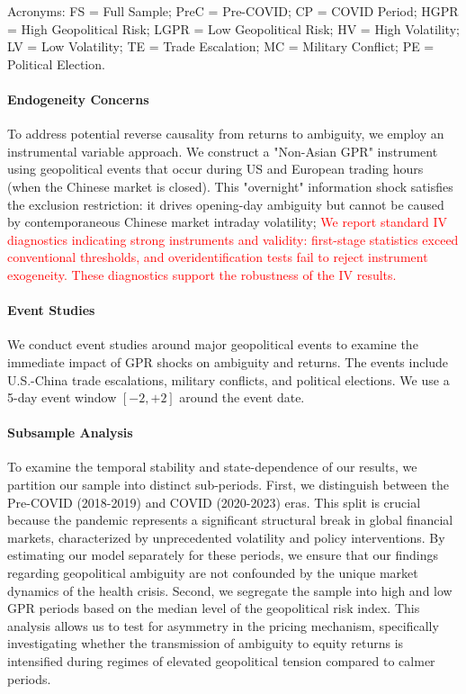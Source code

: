 \documentclass[preprint,12pt,authoryear]{elsarticle}
\begin{document}
\begin{table}[htbp]
\begin{threeparttable}
\begin{tablenotes}[flushleft]
\item[] Acronyms: FS = Full Sample; PreC = Pre-COVID; CP = COVID Period; HGPR = High Geopolitical Risk; LGPR = Low Geopolitical Risk; HV = High Volatility; LV = Low Volatility; TE = Trade Escalation; MC = Military Conflict; PE = Political Election.
\end{tablenotes}
\end{threeparttable}
\end{table}

\paragraph{Endogeneity Concerns} To address potential reverse causality from returns to ambiguity, we employ an instrumental variable approach. We construct a "Non-Asian GPR" instrument using geopolitical events that occur during US and European trading hours (when the Chinese market is closed). This "overnight" information shock satisfies the exclusion restriction: it drives opening-day ambiguity but cannot be caused by contemporaneous Chinese market intraday volatility;
\textcolor{red}{We report standard IV diagnostics indicating strong instruments and validity: first-stage statistics exceed conventional thresholds, and overidentification tests fail to reject instrument exogeneity. These diagnostics support the robustness of the IV results.}

\paragraph{Event Studies} We conduct event studies around major geopolitical events to examine the immediate impact of GPR shocks on ambiguity and returns. The events include U.S.-China trade escalations, military conflicts, and political elections. We use a 5-day event window $[-2, +2]$ around the event date.

\paragraph{Subsample Analysis} To examine the temporal stability and state-dependence of our results, we partition our sample into distinct sub-periods. First, we distinguish between the Pre-COVID (2018-2019) and COVID (2020-2023) eras. This split is crucial because the pandemic represents a significant structural break in global financial markets, characterized by unprecedented volatility and policy interventions. By estimating our model separately for these periods, we ensure that our findings regarding geopolitical ambiguity are not confounded by the unique market dynamics of the health crisis. Second, we segregate the sample into high and low GPR periods based on the median level of the geopolitical risk index. This analysis allows us to test for asymmetry in the pricing mechanism, specifically investigating whether the transmission of ambiguity to equity returns is intensified during regimes of elevated geopolitical tension compared to calmer periods.
\end{document}
